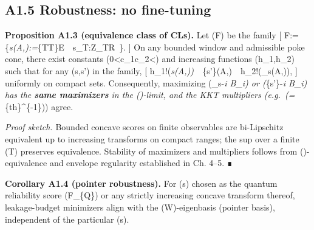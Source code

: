 \documentclass[
]{article}
\numberwithin{equation}{section}
\begin{document}
\hypertarget{a1.5-robustness-no-fine-tuning}{%
\subsection{A1.5 Robustness: no
fine-tuning}\label{a1.5-robustness-no-fine-tuning}}

\textbf{Proposition A1.3 (equivalence class of CLs).} Let (\mathcal F)
be the family {[}
\mathcal F:=\Big\{\emph{s(A,\Phi):=\sup}\{T\in\mathscr T\}\mathbb E~\Big\textbar~s\_T:\mathcal Z\_T\to\mathbb R~\Big\}.
{]} On any bounded window and admissible poke cone, there exist
constants (0\textless c\_1\le c\_2\textless{}\infty) and increasing
functions (h\_1,h\_2) such that for any (s,s') in the family, {[}
h\_1!\big(\emph{s(A,\Phi)\big)~\le~}\{s'\}(A,\Phi)~\le~h\_2!\big(\_s(A,\Phi)\big),
{]} uniformly on compact sets. Consequently, maximizing
(\_s-\sum\lambda\emph{i B\_i) or
(}\{s'\}-\sum\lambda\emph{i B\_i) has the \textbf{same
maximizers} in the (\Gamma)-limit, and the KKT multipliers
(e.g.~(\hbar=\lambda}\{\rm th\}\^{}\{-1\})) agree.

\emph{Proof sketch.} Bounded concave scores on finite observables are
bi-Lipschitz equivalent up to increasing transforms on compact ranges;
the sup over a finite (\mathscr T) preserves equivalence. Stability of
maximizers and multipliers follows from (\Gamma)-equivalence and
envelope regularity established in Ch. 4--5. ∎

\textbf{Corollary A1.4 (pointer robustness).} For (s) chosen as the
quantum reliability score (F\_\{\rm Q\}) or any strictly increasing
concave transform thereof, leakage-budget minimizers align with the
(W)-eigenbasis (pointer basis), independent of the particular (s).
\end{document}
